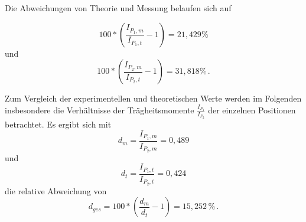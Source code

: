 Die Abweichungen von Theorie und Messung belaufen sich auf

\begin{equation*}
  100 * \left(\frac{I_{P_1,m}}{I_{P_1,t}} - 1\right) = 21,429 \%
\end{equation*}
und
\begin{equation*}
  100 * \left(\frac{I_{P_2,m}}{I_{P_2,t}} - 1\right) = 31,818 \% \,.
\end{equation*}

Zum Vergleich der experimentellen und theoretischen Werte werden im Folgenden insbesondere die Verhältnisse der Trägheitsmomente $\frac{I_{P_1}}{I_{P_2}}$ der einzelnen Positionen betrachtet.
Es ergibt sich mit
\begin{equation*}
  d_{m}= \frac{I_{P_1,m}}{I_{P_2,m}} = 0,489
\end{equation*}
und
\begin{equation*}
  d_{t} = \frac{I_{P_1,t}}{I_{P_2,t}} = 0,424 
\end{equation*}
die relative Abweichung von
\begin{equation*}
  d_{ges} = 100*(\frac{d_m}{d_t}-1) = 15,252 \,\% \,.
\end{equation*}